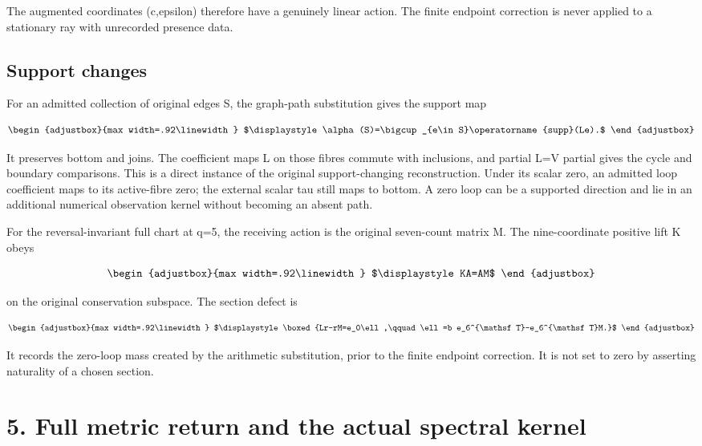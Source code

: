 The augmented coordinates (c,epsilon) therefore have a genuinely linear action. The finite endpoint correction is never applied to a stationary ray with unrecorded presence data.

\subsection{Support changes}\label{n27-support-changes}

For an admitted collection of original edges S, the graph-path substitution gives the support map

\[
\begin{adjustbox}{max width=.92\linewidth}
$\displaystyle \alpha(S)=\bigcup_{e\in S}\operatorname{supp}(Le).$
\end{adjustbox}
\]

It preserves bottom and joins. The coefficient maps L on those fibres commute with inclusions, and partial L=V partial gives the cycle and boundary comparisons. This is a direct instance of the original support-changing reconstruction. Under its scalar zero, an admitted loop coefficient maps to its active-fibre zero; the external scalar tau still maps to bottom. A zero loop can be a supported direction and lie in an additional numerical observation kernel without becoming an absent path.

For the reversal-invariant full chart at q=5, the receiving action is the original seven-count matrix M. The nine-coordinate positive lift K obeys

\[
\begin{adjustbox}{max width=.92\linewidth}
$\displaystyle KA=AM$
\end{adjustbox}
\]

on the original conservation subspace. The section defect is

\[
\begin{adjustbox}{max width=.92\linewidth}
$\displaystyle \boxed{Lr-rM=e_0\ell,\qquad
\ell=b e_6^{\mathsf T}-e_6^{\mathsf T}M.}$
\end{adjustbox}
\]

It records the zero-loop mass created by the arithmetic substitution, prior to the finite endpoint correction. It is not set to zero by asserting naturality of a chosen section.

\section{5. Full metric return and the actual spectral kernel}\label{n27-full-metric-return-and-the-actual-spectral-kernel}

